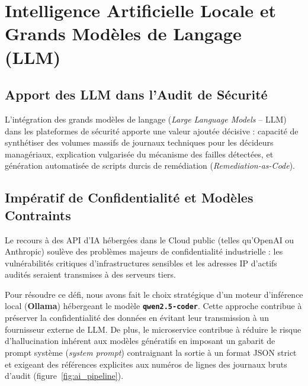 \section{Intelligence Artificielle Locale et Grands Mod\`eles de Langage (LLM)}
\subsection{Apport des LLM dans l'Audit de S\'ecurit\'e}
\par L'int\'egration des grands mod\`eles de langage (\textit{Large Language Models} -- LLM) dans les plateformes de s\'ecurit\'e apporte une valeur ajout\'ee d\'ecisive : capacit\'e de synth\'etiser des volumes massifs de journaux techniques pour les d\'ecideurs manag\'eriaux, explication vulgaris\'ee du m\'ecanisme des failles d\'etect\'ees, et g\'en\'eration automatis\'ee de scripts durcis de rem\'ediation (\textit{Remediation-as-Code}).

\subsection{Imp\'eratif de Confidentialit\'e et Mod\`eles Contraints}
\par Le recours \`a des API d'IA h\'eberg\'ees dans le Cloud public (telles qu'OpenAI ou Anthropic) soul\`eve des probl\`emes majeurs de confidentialit\'e industrielle : les vuln\'erabilit\'es critiques d'infrastructures sensibles et les adresses IP d'actifs audit\'es seraient transmises \`a des serveurs tiers.
\par Pour r\'esoudre ce d\'efi, nous avons fait le choix strat\'egique d'un moteur d'inf\'erence local (\textbf{Ollama}) h\'ebergeant le mod\`ele \textbf{\texttt{qwen2.5-coder}}. Cette approche contribue \`a pr\'eserver la confidentialit\'e des donn\'ees en \'evitant leur transmission \`a un fournisseur externe de LLM. De plus, le microservice contribue \`a r\'eduire le risque d'hallucination inh\'erent aux mod\`eles g\'en\'eratifs en imposant un gabarit de prompt syst\`eme (\textit{system prompt}) contraignant la sortie \`a un format JSON strict et exigeant des r\'ef\'erences explicites aux num\'eros de lignes des journaux bruts d'audit (figure~\ref{fig:ai_pipeline}).

